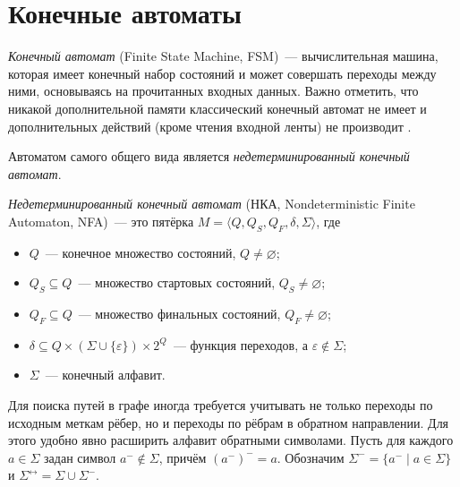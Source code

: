 \section{Конечные автоматы}
\label{sec:FiniteAutomata}

\emph{Конечный автомат} (Finite State Machine, FSM)~--- вычислительная машина, которая имеет конечный набор состояний и может совершать переходы между ними, основываясь на прочитанных входных данных.
Важно отметить, что никакой дополнительной памяти классический конечный автомат не имеет и дополнительных действий (кроме чтения входной ленты) не производит%
.

Автоматом самого общего вида является \emph{недетерминированный конечный автомат}.
\begin{definition}
    \label{def:NondeterministicFiniteAutomata}
    \emph{Недетерминированный конечный автомат} (НКА, Nondeterministic Finite Automaton, NFA)~--- это пятёрка $M = \langle Q, Q_S, Q_F, \delta, \Sigma \rangle$, где
    \begin{itemize}
        \item $Q$~--- конечное множество состояний, $Q \neq \varnothing$;
        \item $Q_S \subseteq Q$~--- множество стартовых состояний, $Q_S \neq \varnothing$;
        \item $Q_F \subseteq Q$~--- множество финальных состояний, $Q_F \neq \varnothing$;
        \item $\delta \subseteq Q \times (\Sigma \cup \{\varepsilon\}) \times 2^Q$~--- функция переходов, а $\varepsilon \notin \Sigma$;
        \item $\Sigma$~--- конечный алфавит.
    \end{itemize}
\end{definition}

Для поиска путей в графе иногда требуется учитывать не только переходы по исходным меткам рёбер, но и переходы по рёбрам в обратном направлении.
Для этого удобно явно расширить алфавит обратными символами.
Пусть для каждого $a \in \Sigma$ задан символ $a^{-} \notin \Sigma$, причём $(a^{-})^{-} = a$.
Обозначим $\Sigma^{-} = \{a^{-} \mid a \in \Sigma\}$ и $\Sigma^{\leftrightarrow} = \Sigma \cup \Sigma^{-}$.

